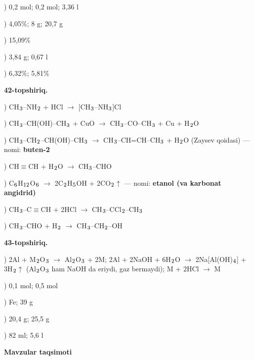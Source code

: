 \documentclass[11pt,a4paper]{article}
\renewcommand{\textsubscript}[1]{\ensuremath{_{\text{\fontsize{8}{8}\selectfont #1}}}}
\begin{document}
) 0,2 mol; 0,2 mol; 3,36 l\par
{}) 4,05\%; 8 g; 20,7 g\par
{}) 15,09\%\par
{}) 3,84 g; 0,67 l\par
{}) 6,32\%; 5,81\%\par
\noindent\textbf{42-topshiriq.}\par
{}) CH\textsubscript{3}--NH\textsubscript{2} + HCl $\to$ [CH\textsubscript{3}--NH\textsubscript{3}]Cl\par
{}) CH\textsubscript{3}--CH(OH)--CH\textsubscript{3} + CuO $\to$ CH\textsubscript{3}--CO--CH\textsubscript{3} + Cu + H\textsubscript{2}O\par
{}) CH\textsubscript{3}--CH\textsubscript{2}--CH(OH)--CH\textsubscript{3} $\to$ CH\textsubscript{3}--CH=CH--CH\textsubscript{3} + H\textsubscript{2}O (Zaysev qoidasi) --- nomi: \textbf{buten-2}\par
{}) CH$\equiv$CH + H\textsubscript{2}O $\to$ CH\textsubscript{3}--CHO\par
{}) C\textsubscript{6}H\textsubscript{12}O\textsubscript{6} $\to$ 2C\textsubscript{2}H\textsubscript{5}OH + 2CO\textsubscript{2}$\uparrow$ --- nomi: \textbf{etanol (va karbonat angidrid)}\par
{}) CH\textsubscript{3}--C$\equiv$CH + 2HCl $\to$ CH\textsubscript{3}--CCl\textsubscript{2}--CH\textsubscript{3}\par
{}) CH\textsubscript{3}--CHO + H\textsubscript{2} $\to$ CH\textsubscript{3}--CH\textsubscript{2}--OH\par
\noindent\textbf{43-topshiriq.}\par
{}) 2Al + M\textsubscript{2}O\textsubscript{3} $\to$ Al\textsubscript{2}O\textsubscript{3} + 2M; 2Al + 2NaOH + 6H\textsubscript{2}O $\to$ 2Na[Al(OH)\textsubscript{4}] + 3H\textsubscript{2}$\uparrow$ (Al\textsubscript{2}O\textsubscript{3} ham NaOH da eriydi, gaz bermaydi); M + 2HCl $\to$ M\par
{}) 0,1 mol; 0,5 mol\par
{}) Fe; 39 g\par
{}) 20,4 g; 25,5 g\par
{}) 82 ml; 5,6 l\par
\par\bigskip\noindent\textbf{Mavzular taqsimoti}\par\smallskip
\end{document}
